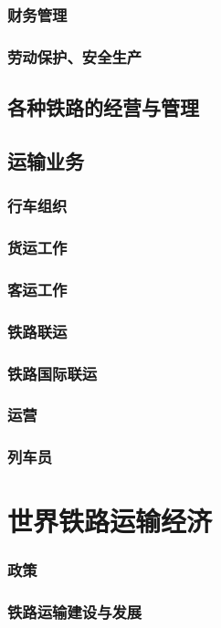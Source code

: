 \documentclass[UTF8]{../../RepresentationUniverse}
\begin{document}
        \subsubsection{财务管理}
        \subsubsection{劳动保护、安全生产}
    \subsection{各种铁路的经营与管理}
    \subsection{运输业务}
        \subsubsection{行车组织}
        \subsubsection{货运工作}
        \subsubsection{客运工作}
        \subsubsection{铁路联运}
        \subsubsection{铁路国际联运}
        \subsubsection{运营}
    \subsubsection{列车员}


\section{世界铁路运输经济}
    \subsubsection{政策}
    \subsubsection{铁路运输建设与发展}
\end{document}
